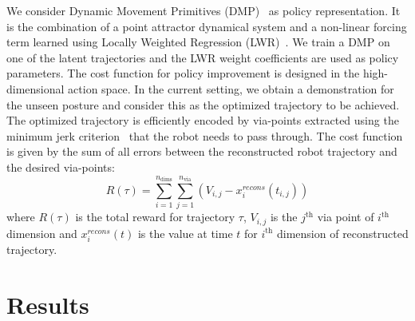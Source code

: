 \documentclass{article}
\begin{document}
We consider Dynamic Movement Primitives (DMP)~\cite{dmp} as policy representation. It is the combination of a point attractor dynamical system and a non-linear forcing term learned using Locally Weighted Regression (LWR)~\cite{lwr}.
We train a DMP on one of the latent trajectories and the LWR weight coefficients are used as policy parameters. The cost function for policy improvement is designed in the high-dimensional action space. In the current setting, we obtain a demonstration for the unseen posture and consider this as the optimized trajectory to be achieved. The optimized trajectory is efficiently encoded by via-points extracted using the minimum jerk criterion~\cite{via} that the robot needs to pass through. The cost function is given by the sum of all errors between the reconstructed robot trajectory and the desired via-points:
\begin{equation}
  R(\tau) = \sum_{i = 1}^{n_{\text{dims}}} \sum_{j = 1}^{n_{\text{via}}} (V_{i,j} - x^{recons}_i(t_{i,j}))
\end{equation}
where $R(\tau)$ is the total reward for trajectory $\tau$, $V_{i,j}$ is the $j^{\text{th}}$ via point of $i^{\text{th}}$ dimension and $x^{recons}_i(t)$ is the value at time $t$ for $i^{\text{th}}$ dimension of reconstructed trajectory.
\section{Results}
\label{section:results}
\end{document}
